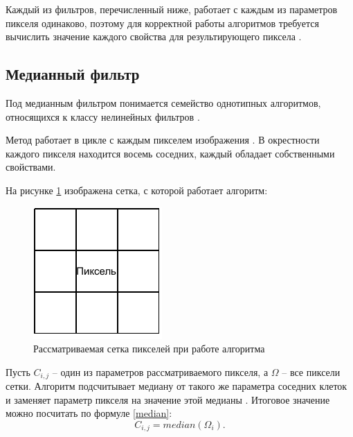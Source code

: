 Каждый из фильтров, перечисленный ниже, работает с каждым из параметров пикселя одинаково, поэтому для корректной работы алгоритмов требуется вычислить значение каждого свойства для результирующего пиксела \cite{filterTechincs}.

\subsection{Медианный фильтр}
Под медианным фильтром понимается семейство однотипных алгоритмов, относящихся к классу нелинейных фильтров \cite{median}.

Метод работает в цикле с каждым пикселем изображения \cite{filterTechincs}. 
В окрестности каждого пикселя находится восемь соседних, каждый обладает собственными свойствами. 

На рисунке \ref{fig::grid} изображена сетка, с которой работает алгоритм:

\FloatBarrier
\begin{figure}[h]	
	\begin{center}
		\includegraphics[]{inc/pdf/grid.pdf}
	\end{center}
	\captionsetup{justification=centering}
	\caption{Рассматриваемая сетка пикселей при работе алгоритма}
	\label{fig::grid}
\end{figure}
\FloatBarrier
\newpage

Пусть $C_{i, j}$ -- один из параметров рассматриваемого пикселя, а $\Omega$ -- все пиксели сетки.
Алгоритм подсчитывает медиану от такого же параметра соседних клеток и заменяет параметр пикселя на значение этой медианы \cite{median}.
Итоговое значение можно посчитать по формуле \eqref{median}: 
\begin{equation}
	\label{median}
	C_{i, j} = median(\Omega_i).
\end{equation}

